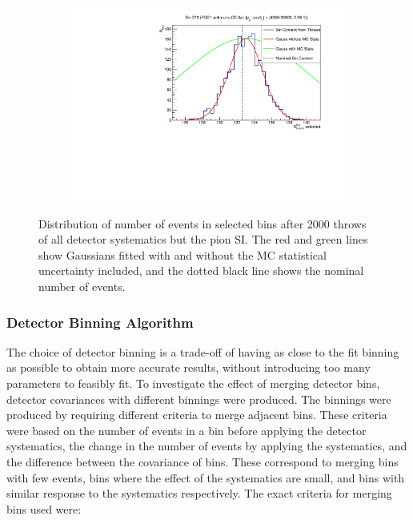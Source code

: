 \begin{figure}
\begin{subfigure}{.49\textwidth}
\end{subfigure}
\begin{subfigure}{.49\textwidth}
  \centering
  \includegraphics[width=0.95\linewidth]{figs/detbin_nopisi570}
\end{subfigure}
\caption{Distribution of number of events in selected bins after 2000 throws of all detector systematics but the pion SI. The red and green lines show Gaussians fitted with and without the MC statistical uncertainty included, and the dotted black line shows the nominal number of events.}
\label{fig:detnopisibins}
\end{figure}

\subsubsection{Detector Binning Algorithm}\label{sec:detbin}

The choice of detector binning is a trade-off of having as close to the fit binning as possible to obtain more accurate results, without introducing too many parameters to feasibly fit. To investigate the effect of merging detector bins, detector covariances with different binnings were produced. The binnings were produced by requiring different criteria to merge adjacent bins. These criteria were based on the number of events in a bin before applying the detector systematics, the change in the number of events by applying the systematics, and the difference between the covariance of bins. These correspond to merging bins with few events, bins where the effect of the systematics are small, and bins with similar response to the systematics respectively. The exact criteria for merging bins used were:

